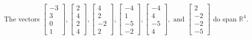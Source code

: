 \begin{exercise}
\begin{exerciseStatement}
  \end{exerciseStatement}
  \begin{exerciseAnswer}
   The vectors \(\left[\begin{array}{r}
-3 \\
3 \\
0 \\
1
\end{array}\right] , \left[\begin{array}{r}
2 \\
4 \\
2 \\
4
\end{array}\right] , \left[\begin{array}{r}
4 \\
2 \\
-2 \\
2
\end{array}\right] , \left[\begin{array}{r}
-4 \\
1 \\
-5 \\
-2
\end{array}\right] , \left[\begin{array}{r}
-4 \\
4 \\
-5 \\
4
\end{array}\right] , \text{ and } \left[\begin{array}{r}
2 \\
-2 \\
-2 \\
-5
\end{array}\right]\) 
  	 do  
	span \(\mathbb{R}^4\).
  


  \end{exerciseAnswer}
\end{exercise}